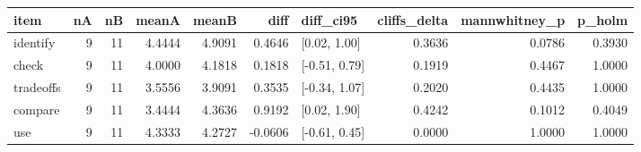 \begin{tabular}{lrrrrrlrrr}
\toprule
     item &  nA &  nB &  meanA &  meanB &    diff &     diff\_ci95 &  cliffs\_delta &  mannwhitney\_p &  p\_holm \\
\midrule
 identify &   9 &  11 & 4.4444 & 4.9091 &  0.4646 &  [0.02, 1.00] &        0.3636 &         0.0786 &  0.3930 \\
    check &   9 &  11 & 4.0000 & 4.1818 &  0.1818 & [-0.51, 0.79] &        0.1919 &         0.4467 &  1.0000 \\
tradeoffs &   9 &  11 & 3.5556 & 3.9091 &  0.3535 & [-0.34, 1.07] &        0.2020 &         0.4435 &  1.0000 \\
  compare &   9 &  11 & 3.4444 & 4.3636 &  0.9192 &  [0.02, 1.90] &        0.4242 &         0.1012 &  0.4049 \\
      use &   9 &  11 & 4.3333 & 4.2727 & -0.0606 & [-0.61, 0.45] &        0.0000 &         1.0000 &  1.0000 \\
\bottomrule
\end{tabular}
